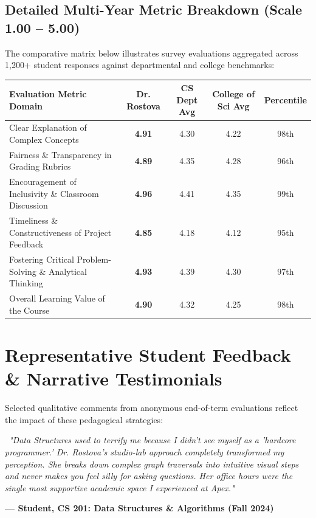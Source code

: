 \documentclass[11pt,a4paper]{article}
\begin{document}
\vspace{2pt}

\subsection{Detailed Multi-Year Metric Breakdown (Scale 1.00 -- 5.00)}

The comparative matrix below illustrates survey evaluations aggregated across 1,200+ student responses against departmental and college benchmarks:

\vspace{2pt}

\bgroup
\def\arraystretch{1.2}
\begin{tabularx}{\textwidth}{X c c c c}
  \toprule
  \rowcolor{PrimaryNavy}
  \color{white}\textbf{Evaluation Metric Domain} & \color{white}\textbf{Dr. Rostova} & \color{white}\textbf{CS Dept Avg} & \color{white}\textbf{College of Sci Avg} & \color{white}\textbf{Percentile} \\
  \midrule
  Clear Explanation of Complex Concepts & \textbf{4.91} & 4.30 & 4.22 & 98th \\
  \rowcolor{AltRowBg}
  Fairness \& Transparency in Grading Rubrics & \textbf{4.89} & 4.35 & 4.28 & 96th \\
  Encouragement of Inclusivity \& Classroom Discussion & \textbf{4.96} & 4.41 & 4.35 & 99th \\
  \rowcolor{AltRowBg}
  Timeliness \& Constructiveness of Project Feedback & \textbf{4.85} & 4.18 & 4.12 & 95th \\
  Fostering Critical Problem-Solving \& Analytical Thinking & \textbf{4.93} & 4.39 & 4.30 & 97th \\
  \rowcolor{AltRowBg}
  Overall Learning Value of the Course & \textbf{4.90} & 4.32 & 4.25 & 98th \\
  \bottomrule
\end{tabularx}
\egroup

\vspace{6pt}

\section{Representative Student Feedback \& Narrative Testimonials}

Selected qualitative comments from anonymous end-of-term evaluations reflect the impact of these pedagogical strategies:

\begin{quotecard}
  \color{NeutralDark}\small
  \faQuoteLeft\ \textit{"Data Structures used to terrify me because I didn't see myself as a 'hardcore programmer.' Dr. Rostova’s studio-lab approach completely transformed my perception. She breaks down complex graph traversals into intuitive visual steps and never makes you feel silly for asking questions. Her office hours were the single most supportive academic space I experienced at Apex."} \par
  \raggedleft{}\fontsize{8.5}{10}\selectfont\color{AccentTeal}\textbf{--- Student, CS 201: Data Structures \& Algorithms (Fall 2024)}
\end{quotecard}
\end{document}
